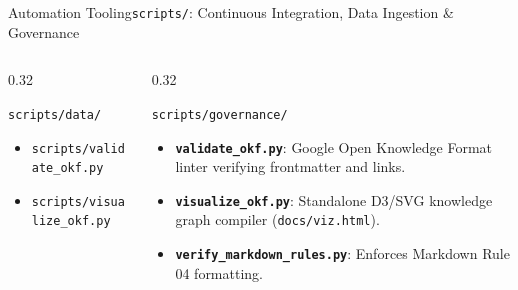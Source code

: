 \begin{frame}{Automation Tooling}{\texttt{scripts/}: Continuous Integration, Data Ingestion \& Governance}
\begin{columns}[T]
\begin{column}{0.32\textwidth}
\begin{block}{\texttt{scripts/data/}}
\begin{itemize}
                    \item \texttt{scripts/validate\_okf.py}
                    \item \texttt{scripts/visualize\_okf.py}
                \end{itemize}
            \end{block}
        \end{column}
        \begin{column}{0.32\textwidth}
            \begin{block}{\texttt{scripts/governance/}}
                \begin{itemize}\scriptsize
                    \item \textbf{\texttt{validate\_okf.py}}: Google Open Knowledge Format linter verifying frontmatter and links.
                    \item \textbf{\texttt{visualize\_okf.py}}: Standalone D3/SVG knowledge graph compiler (\texttt{docs/viz.html}).
                    \item \textbf{\texttt{verify\_markdown\_rules.py}}: Enforces Markdown Rule 04 formatting.
                \end{itemize}
            \end{block}
        \end{column}
    \end{columns}

\end{frame}

